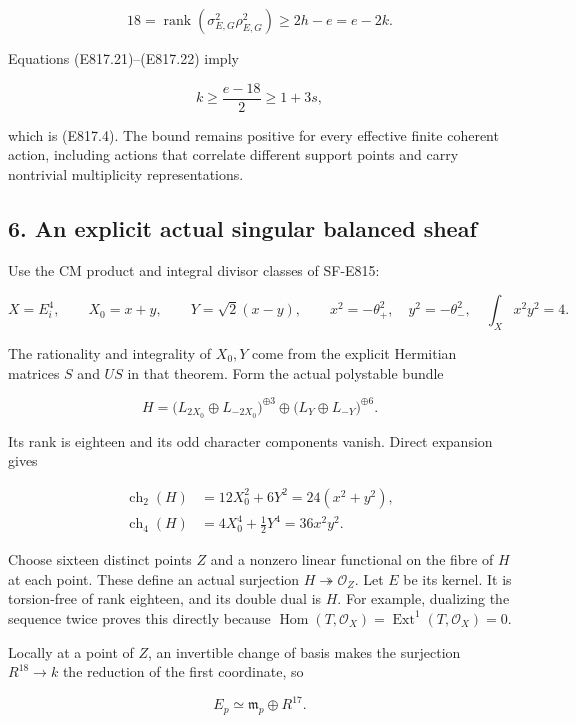 \[
 18=\operatorname{rank}(\sigma^2_{E,G}\rho^2_{E,G})
       \ge 2h-e=e-2k.
 \tag{E817.22}
\]

Equations (E817.21)--(E817.22) imply

\[
 k\ge\frac{e-18}{2}\ge1+3s,
\]

which is (E817.4). The bound remains positive for every effective finite
coherent action, including actions that correlate different support
points and carry nontrivial multiplicity representations.

\subsection{6. An explicit actual singular balanced
sheaf}\label{SF-E817-an-explicit-actual-singular-balanced-sheaf}

Use the CM product and integral divisor classes of SF-E815:

\[
 X=E_i^4,\qquad X_0=x+y,\qquad Y=\sqrt2(x-y),
 \qquad x^2=-\theta_+^2,\quad y^2=-\theta_-^2,
 \quad\int_Xx^2y^2=4.
\]

The rationality and integrality of \(X_0,Y\) come from the explicit
Hermitian matrices \(S\) and \(US\) in that theorem. Form the actual
polystable bundle

\[
 H=\bigl(L_{2X_0}\oplus L_{-2X_0}\bigr)^{\oplus3}
       \oplus\bigl(L_Y\oplus L_{-Y}\bigr)^{\oplus6}.
 \tag{E817.23}
\]

Its rank is eighteen and its odd character components vanish. Direct
expansion gives

\[
 \begin{aligned}
 \operatorname{ch}_2(H)
   &=12X_0^2+6Y^2=24(x^2+y^2),\\
 \operatorname{ch}_4(H)
   &=4X_0^4+\tfrac12Y^4=36x^2y^2.
 \end{aligned}
 \tag{E817.24}
\]

Choose sixteen distinct points \(Z\) and a nonzero linear functional on
the fibre of \(H\) at each point. These define an actual surjection
\(H\twoheadrightarrow\mathcal O_Z\). Let \(E\) be its kernel. It is
torsion-free of rank eighteen, and its double dual is \(H\). For
example, dualizing the sequence twice proves this directly because
\(\operatorname{Hom}(T,\mathcal O_X)=\operatorname{Ext}^1(T,\mathcal O_X)=0\).

Locally at a point of \(Z\), an invertible change of basis makes the
surjection \(R^{18}\to k\) the reduction of the first coordinate, so

\[
 E_p\simeq\mathfrak m_p\oplus R^{17}.
\]

